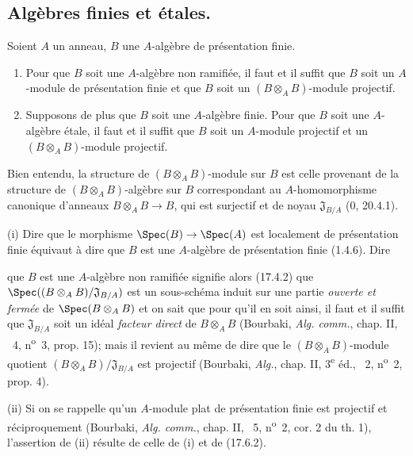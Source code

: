 \subsection{Algèbres finies et étales.}
\label{subsection:IV.18.3}

\begin{proposition}[18.3.1]
\label{IV.18.3.1}
Soient $A$ un anneau, $B$ une $A$-algèbre de présentation finie.
\begin{enumerate}
  \item[(i)] Pour que $B$ soit une $A$-algèbre non ramifiée, il faut et il suffit que $B$ soit un $A$-module de présentation finie et que $B$ soit un $(B\otimes_A B)$-module projectif.
  \item[(ii)] Supposons de plus que $B$ soit une $A$-algèbre finie. Pour que $B$ soit une $A$-algèbre étale, il faut et il suffit que $B$ soit un $A$-module projectif et un $(B\otimes_A B)$-module projectif.
\end{enumerate}
\end{proposition}

Bien entendu, la structure de $(B\otimes_A B)$-module sur $B$ est celle provenant de la structure de $(B\otimes_A B)$-algèbre sur $B$ correspondant au $A$-homomorphisme canonique d'anneaux $B\otimes_A B\to B$, qui est surjectif et de noyau $\mathfrak J_{B/A}$ (0, 20.4.1).

(i) Dire que le morphisme $\Spec(B)\to\Spec(A)$ est localement de présentation finie équivaut à dire que $B$ est une $A$-algèbre de présentation finie (1.4.6). Dire


que $B$ est une $A$-algèbre non ramifiée signifie alors (17.4.2) que $\Spec((B\otimes_A B)/\mathfrak J_{B/A})$ est un sous-schéma induit sur une partie \emph{ouverte et fermée} de $\Spec(B\otimes_A B)$ et on sait que pour qu'il en soit ainsi, il faut et il suffit que $\mathfrak J_{B/A}$ soit un idéal \emph{facteur direct} de $B\otimes_A B$ (Bourbaki, \emph{Alg. comm.}, chap. II, \textsection~4, n\textsuperscript{o}~3, prop. 15); mais il revient au même de dire que le $(B\otimes_A B)$-module quotient $(B\otimes_A B)/\mathfrak J_{B/A}$ est projectif (Bourbaki, \emph{Alg.}, chap. II, 3\textsuperscript{e} éd., \textsection~2, n\textsuperscript{o}~2, prop. 4).

(ii) Si on se rappelle qu'un $A$-module plat de présentation finie est projectif et réciproquement (Bourbaki, \emph{Alg. comm.}, chap. II, \textsection~5, n\textsuperscript{o}~2, cor. 2 du th. 1), l'assertion de (ii) résulte de celle de (i) et de (17.6.2).

